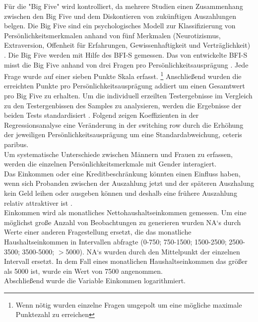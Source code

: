 \documentclass[11pt,a4paper]{article}
\begin{document}
Für die  "Big Five" wird kontrolliert, da mehrere Studien einen Zusammenhang zwischen den Big Five und dem Diskontieren von zukünftigen Auszahlungen belgen\parencite{carter2012religious}. Die Big Five sind ein psychologisches Modell zur Klassifizierung von Persönlichkeitsmerkmalen anhand von fünf Merkmalen (Neurotizismus, Extraversion, Offenheit für Erfahrungen, Gewissenhaftigkeit und Verträglichkeit) \parencite{becker2012relationship}. Die Big Five werden mit Hilfe des BFI-S gemessen. Das von \textcite{gerlitz2005erhebung} entwickelte BFI-S misst die Big Five anhand von drei Fragen pro Persönlichkeitsausprägung  \parencite{becker2012relationship}. Jede Frage wurde auf einer sieben Punkte Skala erfasst. \footnote{Wenn nötig wurden einzelne Fragen umgepolt um eine mögliche maximale Punktezahl zu erreichen} 
Anschließend wurden die erreichten Punkte pro Persönlichkeitsausprägung addiert um einen Gesamtwert pro Big Five  zu erhalten. Um die individuell erzeilten Testergebnisse im Vergleich zu den Testergenbissen des Samples zu analysieren, werden die Ergebnisse der beiden Tests standardisiert \parencite{wooldridge2015introductory}. Folgend zeigen Koeffizienten in der Regressionsanalyse eine Veränderung in der switching row durch die Erhöhung der jeweiligen Persönlichkeitsausprägung um eine Standardabweichung, ceteris paribus.\\

Um systematische Unterschiede zwischen Männern und Frauen zu erfassen, werden die einzelnen Persönlichkeitsmerkmale mit Gender interagiert.\\

Das Einkommen oder eine Kreditbeschränkung könnten einen Einfluss haben, wenn sich Probanden zwischen der Auszahlung jetzt und der späteren Auszhalung kein Geld leihen oder ausgeben können und deshalb eine frühere Auszahlung relativ attraktiver ist \parencite{dohmen2012interpreting}.\\ 
Einkommen wird als monatliches Nettohaushaltseinkommen gemessen. Um eine möglichst große Anzahl von Beobachtungen zu generieren wurden NA`s durch Werte einer anderen Fragestellung ersetzt, die das monatliche Haushaltseinkommen in Intervallen  abfragte (0-750; 750-1500; 1500-2500; 2500-3500; 3500-5000; $>$5000)\parencite{dohmen2010risk}. NA`s  wurden durch den Mittelpunkt der einzelnen Intervall ersetzt. In dem Fall eines monatlichen Haushaltseinkommen das größer als 5000 ist, wurde ein Wert von 7500 angenommen.\\
Abschließend wurde die Variable Einkommen logarithmiert. \\
\end{document}

